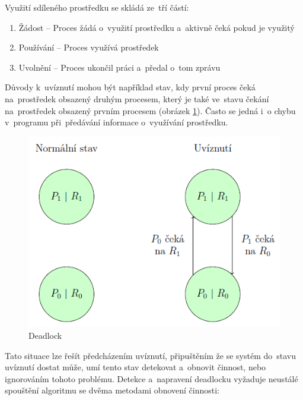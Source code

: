 Využití sdíleného prostředku se skládá ze~tří částí:

\begin{enumerate}
	\item Žádost -- Proces žádá o~využití prostředku a~aktivně čeká pokud je využitý
	\item Používání -- Proces využívá prostředek
	\item Uvolnění -- Proces ukončil práci a~předal o~tom zprávu
\end{enumerate}

Důvody k~uvíznutí mohou být například stav, kdy první proces čeká na~prostředek obsazený druhým procesem, který je také ve~stavu čekání na~prostředek obsazený prvním procesem (obrázek \ref{proc_deadlock}). Často se jedná i~o chybu v~programu při~předávání informace o~využívání prostředku.

\begin{figure}[ht]
	\centering
	\includegraphics[scale=0.5]{images/proc_deadlock.png}
	\caption{Deadlock}
	\label{proc_deadlock}
\end{figure}

Tato situace lze řešít předcházením uvíznutí, připuštěním že se systém do~stavu uvíznutí dostat může, umí tento stav detekovat a~obnovit činnost, nebo ignorováním tohoto problému. Detekce a~napravení deadlocku vyžaduje neustálé spouštění algoritmu se dvěma metodami obnovení činnosti:

